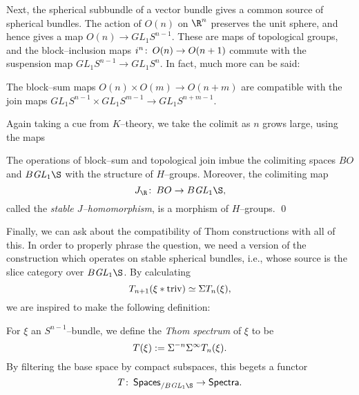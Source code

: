 Next, the spherical subbundle of a vector bundle gives a common source of spherical bundles.  The action of $O(n)$ on $\R^n$ preserves the unit sphere, and hence gives a map $O(n) \to GL_1 S^{n-1}$.  These are maps of topological groups, and the block--inclusion maps $i^n\colon\thinspace O(n) \to O(n+1)$ commute with the suspension map $GL_1 S^{n-1} \to GL_1 S^n$.  In fact, much more can be said:
\begin{lemma}\label{JIsMonoidal}
The block--sum maps $O(n) \times O(m) \to O(n+m)$ are compatible with the join maps $GL_1 S^{n-1} \times GL_1 S^{m-1} \to GL_1 S^{n+m-1}$.
\end{lemma}
\noindent Again taking a cue from $K$--theory, we take the colimit as $n$ grows large, using the maps
\begin{center}
\end{center}
\begin{corollary}
The operations of block--sum and topological join imbue the colimiting spaces $BO$ and $B\GL_1 \S$ with the structure of $H$--groups.  Moreover, the colimiting map \[J_{\R}\co BO \to B\GL_1 \S,\] called the \textit{stable $J$--homomorphism}, is a morphism of $H$--groups. \qed
\end{corollary}
\noindent Finally, we can ask about the compatibility of Thom constructions with all of this.  In order to properly phrase the question, we need a version of the construction which operates on stable spherical bundles, i.e., whose source is the slice category over $B\GL_1 \S$.  By calculating \[T_{n+1}(\xi \ast \text{triv}) \simeq \Sigma T_n(\xi),\] we are inspired to make the following definition:

\begin{definition}
For $\xi$ an $S^{n-1}$--bundle, we define the \textit{Thom spectrum} of $\xi$ to be \[T(\xi) := \Sigma^{-n} \Sigma^\infty T_n(\xi).\]  By filtering the base space by compact subspaces, this begets a functor \[T\co \CatOf{Spaces}_{/ B\GL_1 \S} \to \CatOf{Spectra}.\]
\end{definition}


